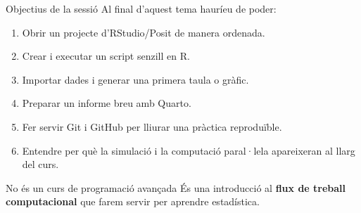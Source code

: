 \documentclass[10pt,aspectratio=169]{beamer}
\newcommand{\R}{\textsf{R}}
\newcommand{\RStudio}{\textsf{RStudio/Posit}}
\newcommand{\GitHub}{\textsf{GitHub}}
\newcommand{\Quarto}{\textsf{Quarto}}
\newcommand{\Git}{\textsf{Git}}
\newcommand{\important}[1]{\textcolor{UABGreen}{\textbf{#1}}}
\begin{document}
\begin{frame}{Objectius de la sessió}
Al final d'aquest tema hauríeu de poder:
\begin{enumerate}
  \item Obrir un projecte d'\RStudio{} de manera ordenada.
  \item Crear i executar un script senzill en \R.
  \item Importar dades i generar una primera taula o gràfic.
  \item Preparar un informe breu amb \Quarto.
  \item Fer servir \Git{} i \GitHub{} per lliurar una pràctica reproduïble.
  \item Entendre per què la simulació i la computació paral·lela apareixeran al llarg del curs.
\end{enumerate}

\vspace{0.25cm}
\begin{block}{No és un curs de programació avançada}
És una introducció al \important{flux de treball computacional} que farem servir per aprendre estadística.
\end{block}
\end{frame}
\end{document}
